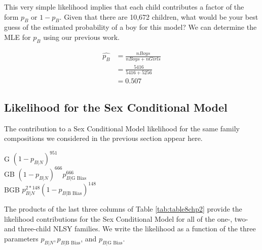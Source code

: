 \documentclass[
]{krantz}
\newcommand{\neutral}{p_{B|N}}
\newcommand{\gbias}{p_{B|\textrm{G Bias}}}
\newcommand{\bbias}{p_{B|\textrm{B Bias}}}
\renewenvironment{quote}{\begin{VF}}{\end{VF}}
\begin{document}
This very simple likelihood implies that each child contributes a factor of the form \(p_B\) or \(1-p_B\). Given that there are 10,672 children, what would be your best guess of the estimated probability of a boy for this model? We can determine the MLE for \(p_B\) using our previous work.

\begin{align}
 \hat{p_B} &= \frac{nBoys}{nBoys + nGirls} \\
 & =  \frac{5416}{5416+5256} \\
 &= 0.507
 \label{eq:MLESexUn}
\end{align}

\hypertarget{sex_cond_lik.sec}{%
\subsection{Likelihood for the Sex Conditional Model}\label{sex_cond_lik.sec}}

The contribution to a Sex Conditional Model likelihood for the same family compositions we considered in the previous section appear here.

\begin{quote}
G \((1-\neutral)^{951}\)\\
GB \((1-\neutral)^{666}\gbias^{666}\)\\
BGB \(\neutral^{2*148}(1-\bbias)^{148}\)
\end{quote}

The products of the last three columns of Table \ref{tab:table8chp2} provide the likelihood contributions for the Sex Conditional Model for all of the one-, two- and three-child NLSY families. We write the likelihood as a function of the three parameters \(\neutral, \bbias\), and \(\gbias\).
\end{document}
